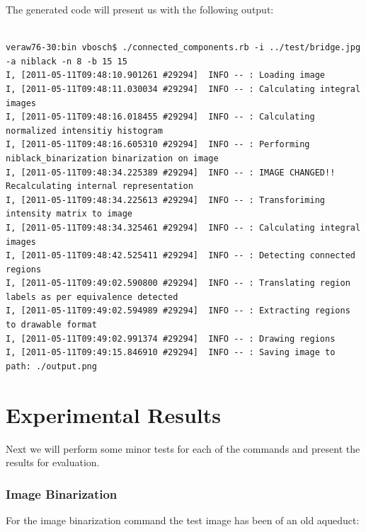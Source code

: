\documentclass[a4paper,10pt,titlepage]{article}
\begin{document}
\par The generated code will present us with the following output:
{\footnotesize\begin{verbatim}

veraw76-30:bin vbosch$ ./connected_components.rb -i ../test/bridge.jpg -a niblack -n 8 -b 15 15
I, [2011-05-11T09:48:10.901261 #29294]  INFO -- : Loading image
I, [2011-05-11T09:48:11.030034 #29294]  INFO -- : Calculating integral images
I, [2011-05-11T09:48:16.018455 #29294]  INFO -- : Calculating normalized intensitiy histogram
I, [2011-05-11T09:48:16.605310 #29294]  INFO -- : Performing niblack_binarization binarization on image
I, [2011-05-11T09:48:34.225389 #29294]  INFO -- : IMAGE CHANGED!! Recalculating internal representation
I, [2011-05-11T09:48:34.225613 #29294]  INFO -- : Transforiming intensity matrix to image
I, [2011-05-11T09:48:34.325461 #29294]  INFO -- : Calculating integral images
I, [2011-05-11T09:48:42.525411 #29294]  INFO -- : Detecting connected regions
I, [2011-05-11T09:49:02.590800 #29294]  INFO -- : Translating region labels as per equivalence detected
I, [2011-05-11T09:49:02.594989 #29294]  INFO -- : Extracting regions to drawable format
I, [2011-05-11T09:49:02.991374 #29294]  INFO -- : Drawing regions
I, [2011-05-11T09:49:15.846910 #29294]  INFO -- : Saving image to path: ./output.png

\end{verbatim}}

\section{Experimental Results}

\par Next we will perform some minor tests for each of the commands and present the results for evaluation.

\subsubsection{Image Binarization}

\par For the image binarization command the test image has been of an old aqueduct:
\end{document}
